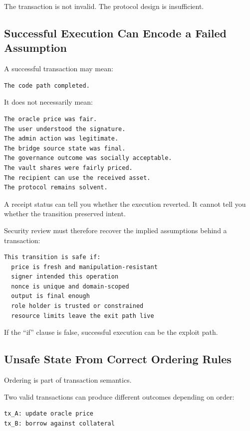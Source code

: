 The transaction is not invalid. The protocol design is insufficient.

\subsection{Successful Execution Can Encode a Failed Assumption}

A successful transaction may mean:

\begin{lstlisting}
The code path completed.
\end{lstlisting}

It does not necessarily mean:

\begin{lstlisting}
The oracle price was fair.
The user understood the signature.
The admin action was legitimate.
The bridge source state was final.
The governance outcome was socially acceptable.
The vault shares were fairly priced.
The recipient can use the received asset.
The protocol remains solvent.
\end{lstlisting}

A receipt status can tell you whether the execution reverted. It cannot
tell you whether the transition preserved intent.

Security review must therefore recover the implied assumptions behind a
transaction:

\begin{lstlisting}
This transition is safe if:
  price is fresh and manipulation-resistant
  signer intended this operation
  nonce is unique and domain-scoped
  output is final enough
  role holder is trusted or constrained
  resource limits leave the exit path live
\end{lstlisting}

If the ``if'' clause is false, successful execution can be the exploit
path.

\subsection{Unsafe State From Correct Ordering Rules}

Ordering is part of transaction semantics.

Two valid transactions can produce different outcomes depending on
order:

\begin{lstlisting}
tx_A: update oracle price
tx_B: borrow against collateral
\end{lstlisting}

